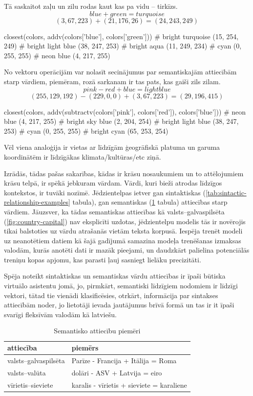 Tā saskaitot zaļu un zilu rodas kaut kas pa vidu -- tirkīzs.
$$blue + green = turquoise$$
$$(3, 67, 223) + (21, 176, 26) = (24, 243, 249)$$
\begin{python}
closest(colors, addv(colors['blue'], colors['green']))
# bright turquoise (15, 254, 249)
# bright light blue (38, 247, 253)
# bright aqua (11, 249, 234)
# cyan (0, 255, 255)
# neon blue (4, 217, 255)
\end{python}

No vektoru operācijām var nolasīt secinājumus par semantiskajām attiecībām starp vārdiem, piemēram, rozā sarkanam ir tas pats, kas gaiši zils zilam.
$$pink - red + blue = light blue$$
$$(255, 129, 192) - (229, 0, 0) + (3, 67, 223) = (29, 196, 415)$$
\begin{python}
closest(colors, addv(subtractv(colors['pink'], colors['red']), colors['blue']))
# neon blue (4, 217, 255)
# bright sky blue (2, 204, 254)
# bright light blue (38, 247, 253)
# cyan (0, 255, 255)
# bright cyan (65, 253, 254)
\end{python}

Vēl viena analoģija ir vietas ar līdzīgām ģeogrāfiskā platuma un garuma koordinātēm ir līdzīgākas klimata/kultūras/etc ziņā. %

Izrādās, tādas pašas sakarības, kādas ir krāsu nosaukumiem un to attēlojumiem krāsu telpā, ir spēkā jebkuram vārdam. Vārdi, kuri bieži atrodas līdzīgos kontekstos, ir tuvāki nozīmē. Jēdzientelpas ietver gan sintaktiskas (\ref{tab:sintactic-relationship-examples} tabula), gan semantiskas (\ref{tab:semantic-relationship-examples} tabula) attiecības starp vārdiem. Jāuzsver, ka tādas semantiskas attiecības kā valsts--galvaspilsēta (\ref{fig:country-capital}) nav eksplicīti uzdotas, jēdzientelpu modelis tās ir novērojis tikai balstoties uz vārdu atrašanās vietām teksta korpusā. Iespēja trenēt modeli uz neanotētiem datiem kā šajā gadījumā samazina modeļa trenēšanas izmaksas valodām, kurās anotēti dati ir mazāk pieejami, un daudzkārt palielina potenciālās treniņu kopas apjomu, kas parasti ļauj sasniegt lielāku precizitāti.


Spēja noteikt sintaktiskas un semantiskas vārdu attiecības ir īpaši būtiska virtuālo asistentu jomā, jo, pirmkārt, semantiski līdzīgiem nodomiem ir līdzīgi vektori, tātad tie vienādi klasificēsies, otrkārt, informācija par sintakses attiecībām noder, jo lietotāji ievada jautājumus brīvā formā un tas ir it īpaši svarīgi fleksīvām valodām kā latviešu.



\begin{table}[htbp]
	\centering
	\caption{Semantisko attiecību piemēri \cite{word2vec2013}}
	\begin{tabular}{ll}\toprule
		attiecība & piemērs  \\\midrule
		valsts--galvaspilsēta   & Parīze - Francija + Itālija = Roma \\
		valsts--valūta   & dolāri - ASV + Latvija = eiro \\
		vīrietis--sieviete   & karalis - vīrietis + sieviete = karaliene \\\bottomrule
	\end{tabular}%
	\label{tab:semantic-relationship-examples}%
\end{table}

